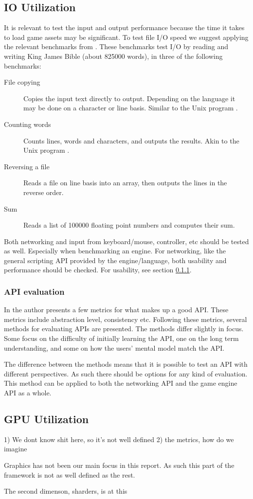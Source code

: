 \subsection{IO Utilization}
It is relevant to test the input and output performance because the time it takes to load game assets may be significant.
To test file \ac{I/O} speed we suggest applying the relevant benchmarks from \cite{Kernighan1998}.
These benchmarks test \ac{I/O} by reading and writing King James Bible (about 825000 words), in three of the following benchmarks: 
\begin{description}
    \item[File copying] Copies the input text directly to output. Depending on the language it may be done on a character or line basis. Similar to the Unix program .
    \item[Counting words] Counts lines, words and characters, and outputs the results. Akin to the Unix program .
    \item[Reversing a file] Reads a file on line basis into an array, then outputs the lines in the reverse order.
    \item[Sum] Reads a list of 100000 floating point numbers and computes their sum.
\end{description}

Both networking and input from keyboard/mouse, controller, etc should be tested as well. Especially when benchmarking an engine.
For networking, like the general scripting \ac{API} provided by the engine/language, both usability and performance should be checked. For usability, see section \ref{sec:api-evaluation}.

\subsubsection{API evaluation}\label{sec:api-evaluation}

In \cite{api-evaluation} the author presents a few metrics for what makes up a good \ac{API}. These metrics include abstraction level, consistency etc. Following these metrics, several methods for evaluating \acs{API}s are presented. The methods differ slightly in focus. Some focus on the difficulty of initially learning the \ac{API}, one on the long term understanding, and some on how the users' mental model match the \ac{API}.

The difference between the methods means that it is possible to test an \ac{API} with different perspectives. As such there should be options for any kind of evaluation. 
This method can be applied to both the networking \ac{API} and the game engine \ac{API} as a whole.

\subsection{GPU Utilization}

1) We dont know shit here, so it's not well defined
2) the metrics, how do we imagine 

Graphics has not been our main focus in this report. 
As such this part of the framework is not as well defined as the rest.

The second dimenson, sharders, is at this  
